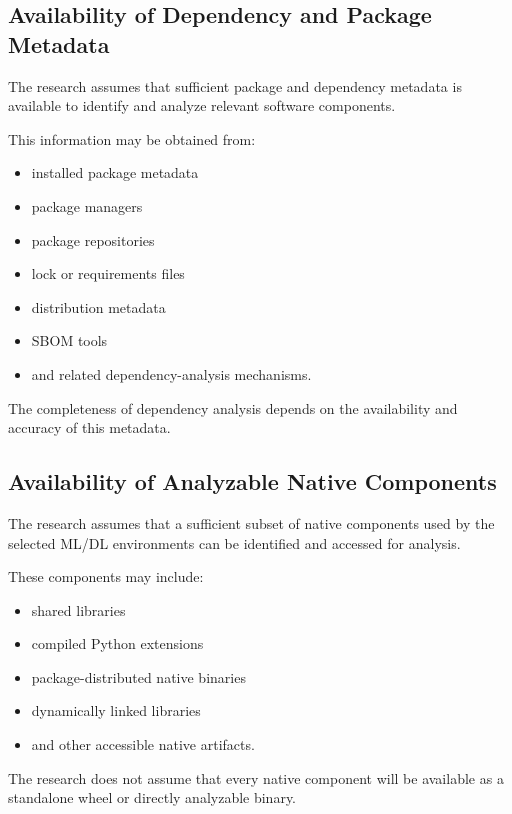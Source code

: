 \documentclass[
  12pt,
  letterpaper,
  oneside]{report}
\providecommand{\tightlist}{%
  \setlength{\itemsep}{0pt}\setlength{\parskip}{0pt}}
\begin{document}
\subsection{Availability of Dependency and Package Metadata}\label{1322-availability-of-dependency-and-package-metadata}

The research assumes that sufficient package and dependency metadata is
available to identify and analyze relevant software components.

This information may be obtained from:

\begin{itemize}
\tightlist
\item
  installed package metadata
\item
  package managers
\item
  package repositories
\item
  lock or requirements files
\item
  distribution metadata
\item
  SBOM tools
\item
  and related dependency-analysis mechanisms.
\end{itemize}

The completeness of dependency analysis depends on the availability and
accuracy of this metadata.

\subsection{Availability of Analyzable Native Components}\label{1323-availability-of-analyzable-native-components}

The research assumes that a sufficient subset of native components used
by the selected ML/DL environments can be identified and accessed for
analysis.

These components may include:

\begin{itemize}
\tightlist
\item
  shared libraries
\item
  compiled Python extensions
\item
  package-distributed native binaries
\item
  dynamically linked libraries
\item
  and other accessible native artifacts.
\end{itemize}

The research does not assume that every native component will be
available as a standalone wheel or directly analyzable binary.
\end{document}
